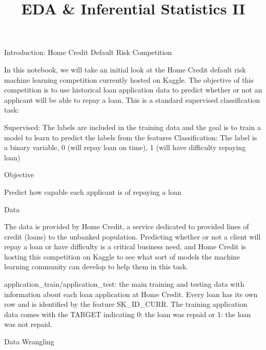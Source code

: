 \documentclass[11pt]{article}
\title{EDA \& Inferential Statistics II}
\begin{document}
    
    
    \maketitle
    
    

    
    Introduction: Home Credit Default Risk Competition

    In this notebook, we will take an initial look at the Home Credit
default risk machine learning competition currently hosted on Kaggle.
The objective of this competition is to use historical loan application
data to predict whether or not an applicant will be able to repay a
loan. This is a standard supervised classification task:

Supervised: The labels are included in the training data and the goal is
to train a model to learn to predict the labels from the features
Classification: The label is a binary variable, 0 (will repay loan on
time), 1 (will have difficulty repaying loan)

    Objective

     Predict how capable each applicant is of repaying a loan

    Data

    The data is provided by Home Credit, a service dedicated to provided
lines of credit (loans) to the unbanked population. Predicting whether
or not a client will repay a loan or have difficulty is a critical
business need, and Home Credit is hosting this competition on Kaggle to
see what sort of models the machine learning community can develop to
help them in this task.

application\_train/application\_test: the main training and testing data
with information about each loan application at Home Credit. Every loan
has its own row and is identified by the feature SK\_ID\_CURR. The
training application data comes with the TARGET indicating 0: the loan
was repaid or 1: the loan was not repaid.

    Data Wrangling
\end{document}
